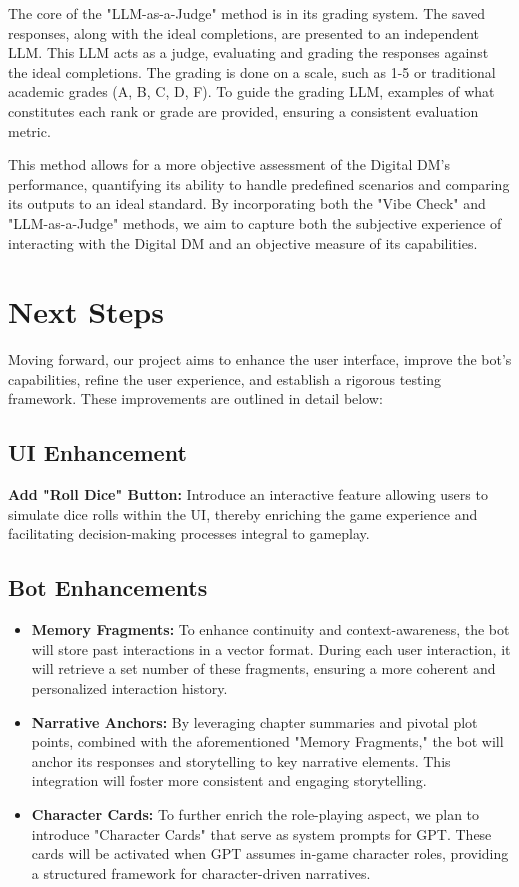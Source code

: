 \documentclass[letterpaper]{article}
\begin{document}
The core of the "LLM-as-a-Judge" method is in its grading system. The saved responses, along with the ideal completions, are presented to an independent LLM. This LLM acts as a judge, evaluating and grading the responses against the ideal completions. The grading is done on a scale, such as 1-5 or traditional academic grades (A, B, C, D, F). To guide the grading LLM, examples of what constitutes each rank or grade are provided, ensuring a consistent evaluation metric.

This method allows for a more objective assessment of the Digital DM's performance, quantifying its ability to handle predefined scenarios and comparing its outputs to an ideal standard. By incorporating both the "Vibe Check" and "LLM-as-a-Judge" methods, we aim to capture both the subjective experience of interacting with the Digital DM and an objective measure of its capabilities.

\section{Next Steps}
Moving forward, our project aims to enhance the user interface, improve the bot's capabilities, refine the user experience, and establish a rigorous testing framework. These improvements are outlined in detail below:

\subsection{UI Enhancement}
\textbf{Add "Roll Dice" Button:} Introduce an interactive feature allowing users to simulate dice rolls within the UI, thereby enriching the game experience and facilitating decision-making processes integral to gameplay.

\subsection{Bot Enhancements}
\begin{itemize}
\item \textbf{Memory Fragments:} To enhance continuity and context-awareness, the bot will store past interactions in a vector format. During each user interaction, it will retrieve a set number of these fragments, ensuring a more coherent and personalized interaction history.
\item \textbf{Narrative Anchors:} By leveraging chapter summaries and pivotal plot points, combined with the aforementioned "Memory Fragments," the bot will anchor its responses and storytelling to key narrative elements. This integration will foster more consistent and engaging storytelling.
\item \textbf{Character Cards:} To further enrich the role-playing aspect, we plan to introduce "Character Cards" that serve as system prompts for GPT. These cards will be activated when GPT assumes in-game character roles, providing a structured framework for character-driven narratives.
\end{itemize}
\end{document}
